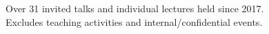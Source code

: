 \newcommand{\talkref}[4]{``#3'' (#2).\\\textit{#4}}
\newcommand{\talkrefwnote}[5]{``#3'' (#2).\\\textit{#4, (#5)}}

\ifdefined\shortcv
    {
        \hspace*{\fill} Over 31 invited talks and individual lectures held since 2017.\\
        \hspace*{\fill} Excludes teaching activities and internal/confidential events.
    }
\else
    {
        
        
    }
\fi


